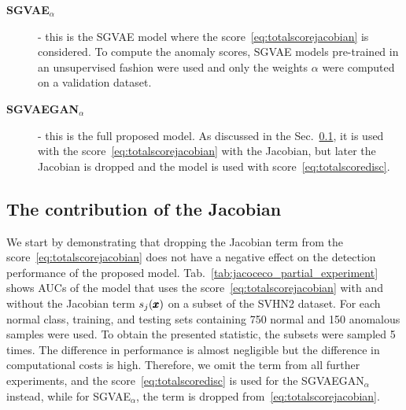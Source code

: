\begin{description}
    \item[\textbf{SGVAE$_{\alpha}$}] - this is the SGVAE model where the score~\eqref{eq:totalscorejacobian} is considered. To compute the anomaly scores,  SGVAE models pre-trained in an unsupervised fashion were used and only the weights $\alpha$ were computed on a validation dataset.
    \item[\textbf{SGVAEGAN$_{\alpha}$}] - this is the full proposed model. As discussed in the Sec.~\ref{sec:jacobian_contribution}, it is used with the score~\eqref{eq:totalscorejacobian} with the Jacobian, but later the Jacobian is dropped and the model is used with score~\eqref{eq:totalscoredisc}.
\end{description}
    
\subsection{The contribution of the Jacobian} \label{sec:jacobian_contribution}

We start by demonstrating that dropping the Jacobian term from the score~\eqref{eq:totalscorejacobian} does not have a negative effect on the detection performance of the proposed model. Tab.~\ref{tab:jacoceco_partial_experiment} shows AUCs of the model that uses the score~\eqref{eq:totalscorejacobian} with and without the Jacobian term $s_j(\pmb{{x}})$ on a subset of the SVHN2 dataset. For each normal class, training, and testing sets containing 750 normal and 150 anomalous samples were used. To obtain the presented statistic, the subsets were sampled 5 times.  The difference in performance is almost negligible but the difference in computational costs is high. Therefore, we omit the term from all further experiments, and the score~\eqref{eq:totalscoredisc} is used for the SGVAEGAN$_{\alpha}$ instead, while for SGVAE$_\alpha$, the term is dropped from~\eqref{eq:totalscorejacobian}.

